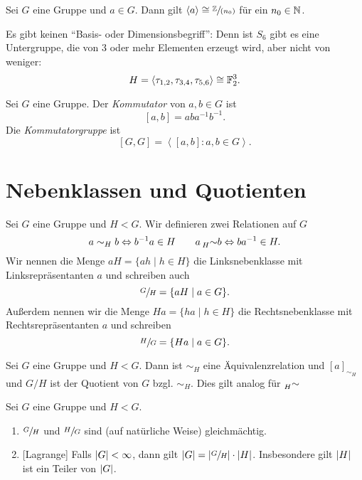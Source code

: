 \begin{lemma}
	Sei $G$ eine Gruppe und $a \in G$. Dann gilt $\left< a \right> \cong \sfrac{\mathbb{Z}}{(n_0)}$ für ein $n_0 \in \mathbb{N}$.
\end{lemma}



\begin{remark}
	Es gibt keinen \enquote{Basis- oder Dimensionsbegriff}:
	Denn ist $S_{6}$ gibt es eine Untergruppe, die von $3$ oder mehr Elementen erzeugt wird, aber nicht von weniger:
	\[
	H = \left< \tau_{1,2}, \tau_{3,4}, \tau_{5,6} \right> \cong \mathbb{F}_{2}^{3}
	.\] 
\end{remark}

\begin{definition}
	Sei $G$ eine Gruppe. Der \emph{Kommutator} von $a,b \in G$ ist 
	\[
		[a,b] = ab a^{-1} b^{-1}
	.\]
	Die \emph{Kommutatorgruppe} ist
	\[
		[G,G] = \left< [a,b]: a,b \in G \right>
	.\] 
\end{definition}

\section{Nebenklassen und Quotienten}

\begin{definition}
	Sei $G$ eine Gruppe und $H < G$.
	Wir definieren zwei Relationen auf $G$ 
	\[
		a \sim_{H} b \Leftrightarrow b^{-1} a \in H \qquad a \prescript{}{H}{\sim} b \Leftrightarrow b a^{-1} \in H
	.\] 
	Wir nennen die Menge $a H = \{a h \mid h \in H\} $ die Linksnebenklasse mit Linksrepräsentanten $a$ und schreiben auch
	\[
	\sfrac{G}{H} = \{a H \mid a \in G\} 
	.\] 
	Außerdem nennen wir die Menge $H a = \{h a \mid h \in H\} $ die Rechtsnebenklasse mit Rechtsrepräsentanten $a$ und schreiben 
	\[
	\sfrac{H}{G} = \{H a \mid a \in G\} 
	.\] 
\end{definition}

\begin{lemma}
	Sei $G$ eine Gruppe und $H < G$. Dann ist $\sim_{H}$ eine Äquivalenzrelation und $[ a ]_{\sim_{H}}$ und $G / H$ ist der Quotient von $G$ bzgl. $\sim_{H}$.
	Dies gilt analog für $\prescript{}{H}{\sim}$
\end{lemma}



\begin{theorem}
	Sei $G$ eine Gruppe und $H < G$.
	\begin{enumerate}[(1)]
		\item $\sfrac{G}{H}$ und $\sfrac{H}{G}$ sind (auf natürliche Weise) gleichmächtig.
		\item {[Lagrange]} Falls $\abs{G} < \infty$, dann gilt $\abs{G} = \abs{\sfrac{G}{H}} \cdot \abs{H}$.
			Insbesondere gilt $\abs{H}$ ist ein Teiler von $\abs{G}$.
	\end{enumerate}
\end{theorem}

